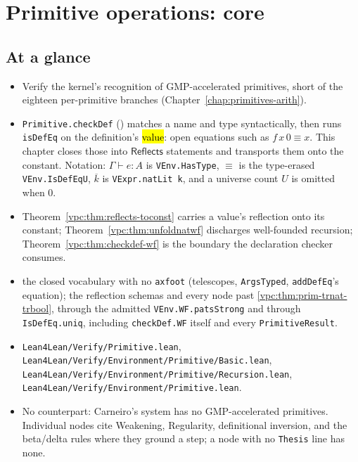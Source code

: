 \chapter{Primitive operations: core}
\label{chap:primitives-core}

\section*{At a glance}
\begin{itemize}
\item {} Verify the kernel's recognition of GMP-accelerated primitives, short of the
eighteen per-primitive branches (Chapter~\ref{chap:primitives-arith}).
\item {} \texttt{Primitive.checkDef} () matches a
name and type syntactically, then runs \texttt{isDefEq} on the definition's \hl{value}: open
equations such as $f\,x\,0 \equiv x$. This chapter closes those into $\mathsf{Reflects}$
statements and transports them onto the constant. Notation: $\Gamma \vdash e : A$ is
\texttt{VEnv.HasType}, $\equiv$ is the type-erased \texttt{VEnv.IsDefEqU}, $\overline{k}$ is
\texttt{VExpr.natLit k}, and a universe count $U$ is omitted when $0$.
\item {} Theorem~\ref{vpc:thm:reflects-toconst} carries a value's reflection onto
its constant; Theorem~\ref{vpc:thm:unfoldnatwf} discharges well-founded recursion;
Theorem~\ref{vpc:thm:checkdef-wf} is the boundary the declaration checker consumes.
\item {} \stProved{} the closed vocabulary with no \texttt{axfoot} (telescopes,
\texttt{ArgsTyped}, \texttt{addDefEq}'s equation); \stTainted{} the reflection schemas and every
node past \ref{vpc:thm:prim-trnat-trbool}, through the admitted \texttt{VEnv.WF.patsStrong} and
through \texttt{IsDefEq.uniq}, including \texttt{checkDef.WF} itself and every
\texttt{PrimitiveResult}.
\item {} \texttt{Lean4Lean/Verify/Primitive.lean},
\texttt{Lean4Lean/Verify/Environment/Primitive/Basic.lean},
\texttt{Lean4Lean/Verify/Environment/Primitive/Recursion.lean},
\texttt{Lean4Lean/Verify/Environment/Primitive.lean}.
\item {} No counterpart: Carneiro's system has no GMP-accelerated primitives.
Individual nodes cite Weakening, Regularity, definitional inversion, and the beta/delta rules
where they ground a step; a node with no \texttt{Thesis} line has none.
\end{itemize}

